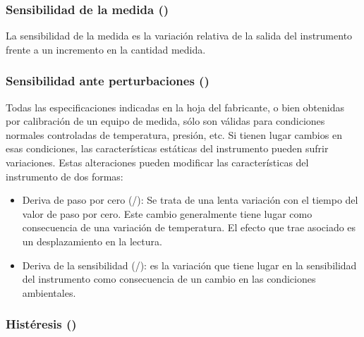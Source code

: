 \subsubsection
	[Sensibilidad de la medida]
	{Sensibilidad de la medida ()}

La sensibilidad de la medida es la variación relativa de la salida del instrumento frente a un incremento en la cantidad medida.

\subsubsection
	[Sensibilidad ante perturbaciones]
	{Sensibilidad ante perturbaciones ()}

Todas las especificaciones indicadas en la hoja del fabricante, o bien obtenidas por calibración de un equipo de medida, sólo son válidas para condiciones normales controladas de temperatura, presión, etc. Si tienen lugar cambios en esas condiciones, las características estáticas del instrumento pueden sufrir variaciones. Estas alteraciones pueden modificar las características del instrumento de dos formas:

{\samepage\begin{itemize}

\item
Deriva de paso por cero (/): Se trata de una lenta variación con el tiempo del valor de paso por cero. Este cambio generalmente tiene lugar como consecuencia de una variación de temperatura. El efecto que trae asociado es un desplazamiento en la lectura.

\item
Deriva de la sensibilidad (/): es la variación que tiene lugar en la sensibilidad del instrumento como consecuencia de un cambio en las condiciones ambientales.

\end{itemize}}


\subsubsection{Histéresis ()}

